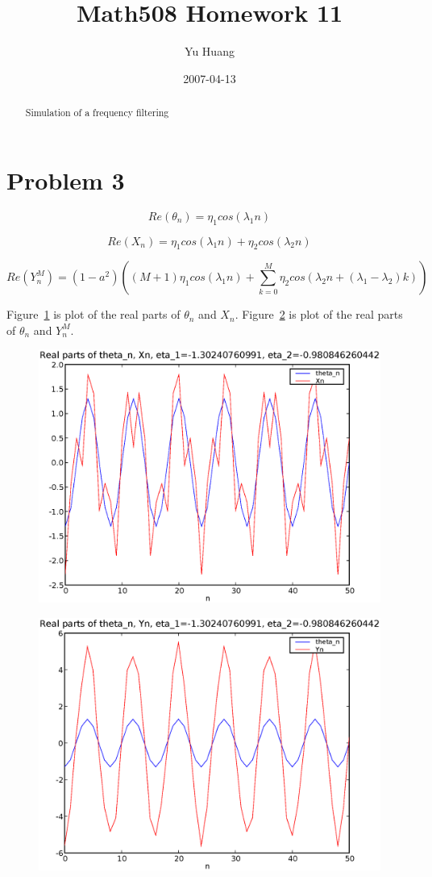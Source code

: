 \documentclass[a4paper,10pt]{article}
\title{Math508 Homework 11}
\author{Yu Huang}
\date{2007-04-13}
\begin{document}
\maketitle

\begin{abstract}
Simulation of a frequency filtering
\end{abstract}

\section{Problem 3}
\begin{equation}
Re(\theta_n) = \eta_1 cos(\lambda_1 n)
\end{equation}

\begin{equation}
Re(X_n) = \eta_1 cos(\lambda_1 n) + \eta_2 cos(\lambda_2 n)
\end{equation}

\begin{equation}
Re(Y_n^M) = (1-a^2)((M+1)\eta_1 cos(\lambda_1 n) + \sum_{k=0}^M \eta_2 cos(\lambda_2 n + (\lambda_1-\lambda_2) k))
\end{equation}

Figure~\ref{f1} is plot of the real parts of $\theta_n$ and $X_n$. Figure~\ref{f2} is plot of the real parts of $\theta_n$ and $Y_n^M$.

\begin{figure}
\includegraphics[width=1\textwidth]{hw11_3_theta_n_Xn.eps}
\caption{}\label{f1}
\end{figure}

\begin{figure}
\includegraphics[width=1\textwidth]{hw11_3_theta_n_Yn.eps}
\caption{}\label{f2}
\end{figure}
\end{document}
